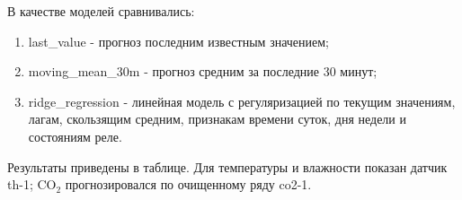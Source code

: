 \documentclass[a4paper,14pt]{extarticle}
\renewcommand{\texttt}[1]{\textnormal{#1}}
\providecommand{\tightlist}{%
  \setlength{\itemsep}{0pt}\setlength{\parskip}{0pt}}
\begin{document}
В качестве моделей сравнивались:

\begin{enumerate}
\def\labelenumi{\arabic{enumi})}
\tightlist
\item
  \texttt{last\_value} - прогноз последним известным значением;
\item
  \texttt{moving\_mean\_30m} - прогноз средним за последние 30 минут;
\item
  \texttt{ridge\_regression} - линейная модель с регуляризацией по
  текущим значениям, лагам, скользящим средним, признакам времени суток,
  дня недели и состояниям реле.
\end{enumerate}

Результаты приведены в таблице. Для температуры и влажности показан
датчик \texttt{th-1}; CO\(_2\) прогнозировался по очищенному ряду
\texttt{co2-1}.
\end{document}
